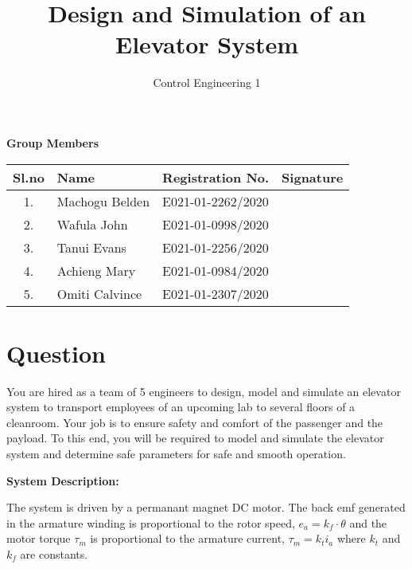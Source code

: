 \documentclass[10pt,a4paper]{report}
\title{Design and Simulation of an Elevator System}
\author{Control Engineering 1}
\begin{document}
\maketitle

\textbf{Group Members}
\begin{table}[h]
\centering
\begin{tabular}{|c|l|l|l|}
\hline
Sl.no & Name & Registration No. & Signature\\\hline
1. & Machogu Belden & E021-01-2262/2020 &  \\\hline
2. & Wafula John & E021-01-0998/2020 &  \\\hline
3. & Tanui Evans & E021-01-2256/2020 &  \\\hline
4. & Achieng Mary & E021-01-0984/2020 &  \\\hline
5. & Omiti Calvince & E021-01-2307/2020 &  \\\hline
\end{tabular}
\end{table}

\pagebreak

\section{Question}




You are hired as a team of 5 engineers to design, model and simulate an elevator system to transport employees of an upcoming lab to several floors of a cleanroom. Your job is to ensure safety and comfort of the passenger and the payload. To this end, you will be required to model and simulate the elevator system and determine safe parameters for safe and smooth operation.\newline

\textbf{System Description: }

The system is driven by a permanant magnet DC motor. The back emf generated in the armature winding is proportional to the rotor speed, $e_{a} = k_{f} \cdot \theta$ and the motor torque $\tau_{m}$ is proportional to the armature current, $\tau_{m} = k_{t} i_{a}$ where $k_{t}$ and $k_{f}$ are constants.
\pagebreak
\end{document}
